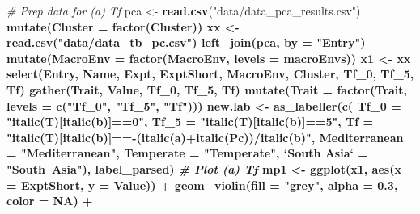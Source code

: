 \documentclass[
]{article}
\newenvironment{Shaded}{\begin{snugshade}}{\end{snugshade}}
\newcommand{\CommentTok}[1]{\textcolor[rgb]{0.56,0.35,0.01}{\textit{#1}}}
\newcommand{\DataTypeTok}[1]{\textcolor[rgb]{0.13,0.29,0.53}{#1}}
\newcommand{\DecValTok}[1]{\textcolor[rgb]{0.00,0.00,0.81}{#1}}
\newcommand{\FloatTok}[1]{\textcolor[rgb]{0.00,0.00,0.81}{#1}}
\newcommand{\KeywordTok}[1]{\textcolor[rgb]{0.13,0.29,0.53}{\textbf{#1}}}
\newcommand{\NormalTok}[1]{#1}
\newcommand{\OperatorTok}[1]{\textcolor[rgb]{0.81,0.36,0.00}{\textbf{#1}}}
\newcommand{\OtherTok}[1]{\textcolor[rgb]{0.56,0.35,0.01}{#1}}
\newcommand{\StringTok}[1]{\textcolor[rgb]{0.31,0.60,0.02}{#1}}
\begin{document}
\begin{Shaded}
\begin{Highlighting}[]
\CommentTok{# Prep data for (a) Tf}
\NormalTok{pca <-}\StringTok{ }\KeywordTok{read.csv}\NormalTok{(}\StringTok{"data/data_pca_results.csv"}\NormalTok{) }\OperatorTok{%
\StringTok{  }\KeywordTok{mutate}\NormalTok{(}\DataTypeTok{Cluster =} \KeywordTok{factor}\NormalTok{(Cluster))}
\NormalTok{xx <-}\StringTok{ }\KeywordTok{read.csv}\NormalTok{(}\StringTok{"data/data_tb_pc.csv"}\NormalTok{) }\OperatorTok{%
\StringTok{  }\KeywordTok{left_join}\NormalTok{(pca, }\DataTypeTok{by =} \StringTok{"Entry"}\NormalTok{) }\OperatorTok{%
\StringTok{  }\KeywordTok{mutate}\NormalTok{(}\DataTypeTok{MacroEnv =} \KeywordTok{factor}\NormalTok{(MacroEnv, }\DataTypeTok{levels =}\NormalTok{ macroEnvs))}
\NormalTok{x1 <-}\StringTok{ }\NormalTok{xx }\OperatorTok{%
\StringTok{  }\KeywordTok{select}\NormalTok{(Entry, Name, Expt, ExptShort, MacroEnv, Cluster, Tf_}\DecValTok{0}\NormalTok{, Tf_}\DecValTok{5}\NormalTok{, Tf) }\OperatorTok{%
\StringTok{  }\KeywordTok{gather}\NormalTok{(Trait, Value, Tf_}\DecValTok{0}\NormalTok{, Tf_}\DecValTok{5}\NormalTok{, Tf) }\OperatorTok{%
\StringTok{  }\KeywordTok{mutate}\NormalTok{(}\DataTypeTok{Trait =} \KeywordTok{factor}\NormalTok{(Trait, }\DataTypeTok{levels =} \KeywordTok{c}\NormalTok{(}\StringTok{"Tf_0"}\NormalTok{, }\StringTok{"Tf_5"}\NormalTok{, }\StringTok{"Tf"}\NormalTok{)))}
\NormalTok{new.lab <-}\StringTok{ }\KeywordTok{as_labeller}\NormalTok{(}\KeywordTok{c}\NormalTok{(}
  \DataTypeTok{Tf_0 =} \StringTok{"italic(T)[italic(b)]==0"}\NormalTok{, }\DataTypeTok{Tf_5 =} \StringTok{"italic(T)[italic(b)]==5"}\NormalTok{,}
  \DataTypeTok{Tf =} \StringTok{"italic(T)[italic(b)]==-(italic(a)+italic(Pc))/italic(b)"}\NormalTok{, }
  \DataTypeTok{Mediterranean =} \StringTok{"Mediterranean"}\NormalTok{, }\DataTypeTok{Temperate =} \StringTok{"Temperate"}\NormalTok{, }
  \StringTok{`}\DataTypeTok{South Asia}\StringTok{`}\NormalTok{ =}\StringTok{ "South~Asia"}\NormalTok{), label_parsed)}
\CommentTok{# Plot (a) Tf}
\NormalTok{mp1 <-}\StringTok{ }\KeywordTok{ggplot}\NormalTok{(x1, }\KeywordTok{aes}\NormalTok{(}\DataTypeTok{x =}\NormalTok{ ExptShort, }\DataTypeTok{y =}\NormalTok{ Value)) }\OperatorTok{+}
\StringTok{  }\KeywordTok{geom_violin}\NormalTok{(}\DataTypeTok{fill =} \StringTok{"grey"}\NormalTok{, }\DataTypeTok{alpha =} \FloatTok{0.3}\NormalTok{, }\DataTypeTok{color =} \OtherTok{NA}\NormalTok{) }\OperatorTok{+}\StringTok{ }
}}}}}}
\end{Highlighting}
\end{Shaded}
\end{document}
